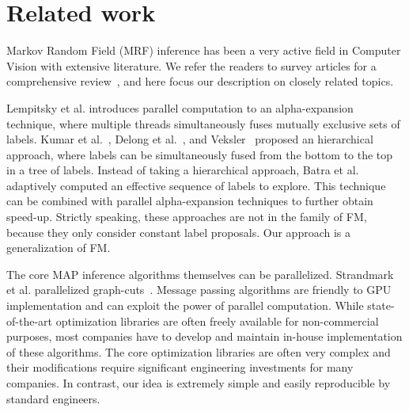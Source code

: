 \section{Related work}


Markov Random Field (MRF) inference has been a very active field in
Computer Vision with extensive literature. We refer the readers to
survey articles for a comprehensive
review~\cite{middlebury_mrf,comparative_study_of_modern_inference}, and
here focus our description on closely related topics.


\noindent Lempitsky et al. introduces parallel computation to an
alpha-expansion technique, where multiple threads simultaneously fuses
mutually exclusive sets of labels. Kumar et
al.~\cite{hierarchical_graph_cuts_kumar_and_koller}, Delong et
al.~\cite{delong}, and Veksler~\cite{olga} proposed an hierarchical
approach, where labels can be simultaneously fused from the bottom to
the top in a tree of labels. 
% 
Instead of taking a hierarchical approach, Batra et
al.~\cite{Dhruv_pushmeet_making_the_right_move} adaptively computed an
effective sequence of labels to explore. This technique can be combined
with parallel alpha-expansion techniques to further obtain speed-up.
%
Strictly speaking, these approaches are not in the family of FM, because
they only consider constant label proposals. Our approach is a
generalization of FM.



\noindent
The core MAP inference algorithms themselves can be parallelized.
Strandmark et al. parallelized graph-cuts~\cite{strandmark2010parallel}.
%
Message passing algorithms are friendly to GPU implementation and can
exploit the power of parallel computation.
%
%
While state-of-the-art optimization libraries are often freely available
for non-commercial purposes, most companies have to develop and maintain
in-house implementation of these algorithms.  The core optimization
libraries are often very complex and their modifications require
significant engineering investments for many companies. In contrast, our
idea is extremely simple and easily reproducible by standard engineers.





